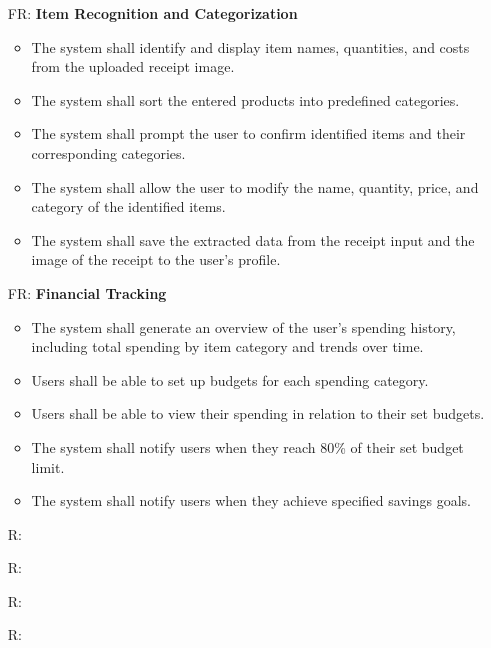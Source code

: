 \documentclass[12pt]{article}
\newcounter{reqnum} %
\newcounter{frnum} %
\begin{document}
\begin{itemize}
  \item [FR\refstepcounter{frnum}\thefrnum :] \textbf{Item Recognition and Categorization}
    \begin{itemize}
      \item The system shall identify and display item names, quantities, and costs from the uploaded receipt image.
      \item The system shall sort the entered products into predefined categories.
      \item The system shall prompt the user to confirm identified items and their corresponding categories.
      \item The system shall allow the user to modify the name, quantity, price, and category of the identified items.
      \item The system shall save the extracted data from the receipt input and the image of the receipt to the user’s profile.    
    \end{itemize}

  \item [FR\refstepcounter{frnum}\thefrnum :] \textbf{Financial Tracking}
    \begin{itemize}
      \item The system shall generate an overview of the user's spending history, including total spending by item category and trends over time.
      \item Users shall be able to set up budgets for each spending category.
      \item Users shall be able to view their spending in relation to their set budgets.
      \item The system shall notify users when they reach 80\% of their set budget limit.
      \item The system shall notify users when they achieve specified savings goals.
    \end{itemize}

\end{itemize}
\noindent \begin{itemize}

\item[R\refstepcounter{reqnum}\thereqnum \label{R_Inputs}:] 

\item[R\refstepcounter{reqnum}\thereqnum \label{R_OutputInputs}:] 

\item[R\refstepcounter{reqnum}\thereqnum \label{R_Calculate}:] 

\item[R\refstepcounter{reqnum}\thereqnum \label{R_VerifyOutput}:]

\end{itemize}
\end{document}

